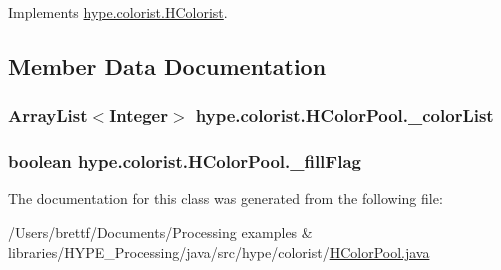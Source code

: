 

Implements \hyperlink{interfacehype_1_1colorist_1_1_h_colorist_ac55134266720e757465c9b60ca8f10eb}{hype.\-colorist.\-H\-Colorist}.



\subsection{Member Data Documentation}
\hypertarget{classhype_1_1colorist_1_1_h_color_pool_ac114c69e5ac822af673061d677e6529e}{
\subsubsection[{\-\_\-color\-List}]{\setlength{\rightskip}{0pt plus 5cm}Array\-List$<$Integer$>$ hype.\-colorist.\-H\-Color\-Pool.\-\_\-color\-List\hspace{0.3cm}{\ttfamily [protected]}}}\label{classhype_1_1colorist_1_1_h_color_pool_ac114c69e5ac822af673061d677e6529e}
\hypertarget{classhype_1_1colorist_1_1_h_color_pool_ae79b54a80c86792f39acc720b7f63c2d}{
\subsubsection[{\-\_\-fill\-Flag}]{\setlength{\rightskip}{0pt plus 5cm}boolean hype.\-colorist.\-H\-Color\-Pool.\-\_\-fill\-Flag\hspace{0.3cm}{\ttfamily [protected]}}}\label{classhype_1_1colorist_1_1_h_color_pool_ae79b54a80c86792f39acc720b7f63c2d}


The documentation for this class was generated from the following file\-:\begin{DoxyCompactItemize}
\item 
/\-Users/brettf/\-Documents/\-Processing examples \& libraries/\-H\-Y\-P\-E\-\_\-\-Processing/java/src/hype/colorist/\hyperlink{_h_color_pool_8java}{H\-Color\-Pool.\-java}\end{DoxyCompactItemize}
